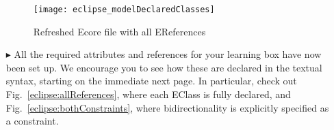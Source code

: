 \begin{itemize}
\vspace{1cm}

\begin{figure}[htbp]
	\centering
  \texttt{[image: eclipse\_modelDeclaredClasses]}
	\caption{Refreshed Ecore file with all EReferences}
	\label{eclipse:model_allClasses}
\end{figure}

\vspace{1cm}

\item[$\blacktriangleright$] All the required attributes and references for your learning box have now been set up. We encourage you to see how these are
declared in the textual syntax, starting on the immediate next page. In particular, check out Fig.~\ref{eclipse:allReferences}, where each EClass is fully
declared, and Fig.~\ref{eclipse:bothConstraints}, where bidirectionality is explicitly specified as a constraint.


\end{itemize}
